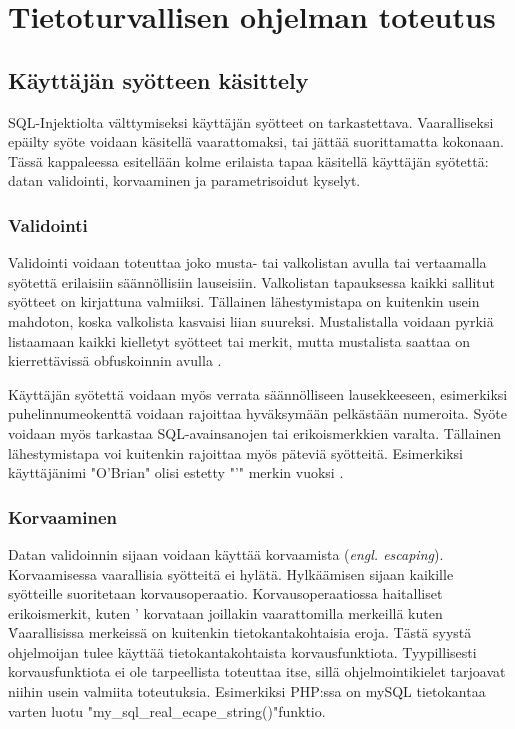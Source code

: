 \documentclass[finnish]{tktltiki2}
\theoremstyle{definition}
\theoremstyle{remark}
\begin{document}
	\section {Tietoturvallisen ohjelman toteutus}
	\subsection{Käyttäjän syötteen käsittely}
		SQL-Injektiolta välttymiseksi käyttäjän syötteet on tarkastettava. Vaaralliseksi epäilty syöte voidaan käsitellä vaarattomaksi, tai jättää suorittamatta kokonaan. Tässä kappaleessa esitellään kolme erilaista tapaa käsitellä käyttäjän syötettä: datan validointi, korvaaminen ja parametrisoidut kyselyt.
		
		 \subsubsection{Validointi}
		 Validointi voidaan toteuttaa joko musta- tai valkolistan avulla tai vertaamalla syötettä erilaisiin säännöllisiin lauseisiin. Valkolistan tapauksessa kaikki sallitut syötteet on kirjattuna valmiiksi. Tällainen lähestymistapa on kuitenkin usein mahdoton, koska valkolista kasvaisi liian suureksi. Mustalistalla voidaan pyrkiä listaamaan kaikki kielletyt syötteet tai merkit, mutta mustalista saattaa on kierrettävissä obfuskoinnin avulla \cite{encoding}. 
		
		Käyttäjän syötettä voidaan myös verrata säännölliseen lausekkeeseen, esimerkiksi puhelinnumeokenttä voidaan rajoittaa hyväksymään pelkästään numeroita. Syöte voidaan myös tarkastaa SQL-avainsanojen tai erikoismerkkien varalta. Tällainen lähestymistapa voi kuitenkin rajoittaa myös päteviä syötteitä. Esimerkiksi käyttäjänimi "O'Brian" olisi estetty "'" merkin vuoksi \cite{generation}.
		
		
		\subsubsection{Korvaaminen}
		Datan validoinnin sijaan voidaan käyttää korvaamista (\textit{engl. escaping}). Korvaamisessa vaarallisia syötteitä ei hylätä. Hylkäämisen sijaan kaikille syötteille suoritetaan korvausoperaatio. Korvausoperaatiossa haitalliset erikoismerkit, kuten ' korvataan joillakin vaarattomilla merkeillä kuten \. Vaarallisissa merkeissä on kuitenkin tietokantakohtaisia eroja. Tästä syystä ohjelmoijan tulee käyttää tietokantakohtaista korvausfunktiota. Tyypillisesti korvausfunktiota ei ole tarpeellista toteuttaa itse, sillä ohjelmointikielet tarjoavat niihin usein valmiita toteutuksia. Esimerkiksi PHP:ssa on mySQL tietokantaa varten luotu "my{\_}sql{\_}real{\_}ecape\_string()"\space funktio. 
		
\end{document}
